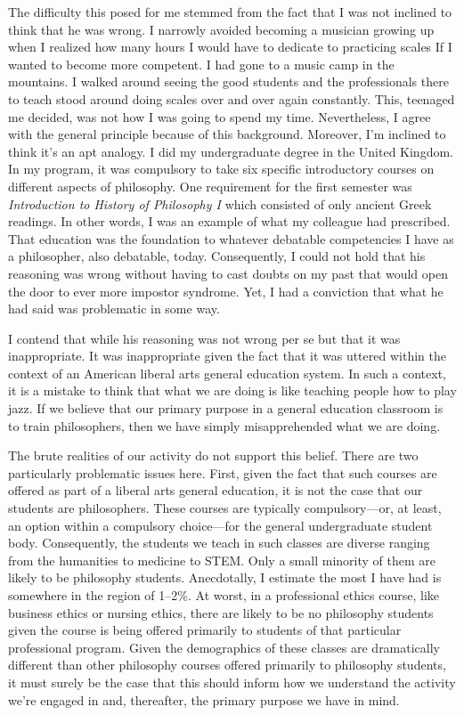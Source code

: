 \documentclass[letterpaper,notitlepage,12pt]{article}
\begin{document}
The difficulty this posed for me stemmed from the fact that I was not inclined
to think that he was wrong.
I narrowly avoided becoming a musician growing up when I realized how many hours
I would have to dedicate to practicing scales If I wanted to become more
competent.
I had gone to a music camp in the mountains.
I walked around seeing the good students and the professionals there to teach
stood around doing scales over and over again constantly.
This, teenaged me decided, was not how I was going to spend my time.
Nevertheless, I agree with the general principle because of this background.
Moreover, I'm inclined to think it's an apt analogy.
I did my undergraduate degree in the United Kingdom.
In my program, it was compulsory to take six specific introductory courses on
different aspects of philosophy.
One requirement for the first semester was \textit{Introduction to History of
Philosophy I} which consisted of only ancient Greek readings.
In other words, I was an example of what my colleague had prescribed.
That education was the foundation to whatever debatable competencies I have as a
philosopher, also debatable, today.
Consequently, I could not hold that his reasoning was wrong without having to
cast doubts on my past that would open the door to ever more impostor syndrome.
Yet, I had a conviction that what he had said was problematic in some way.

I contend that while his reasoning was not wrong per se but that it was
inappropriate.
It was inappropriate given the fact that it was uttered within the context of an
American liberal arts general education system.
In such a context, it is a mistake to think that what we are doing is like
teaching people how to play jazz.
If we believe that our primary purpose in a general education classroom is to
train philosophers, then we have simply misapprehended what we are doing.

The brute realities of our activity do not support this belief.
There are two particularly problematic issues here.
First, given the fact that such courses are offered as part of a liberal arts
general education, it is not the case that our students are philosophers.
These courses are typically compulsory---or, at least, an option within a
compulsory choice---for the general undergraduate student body.
Consequently, the students we teach in such classes are diverse ranging from the
humanities to medicine to STEM.
Only a small minority of them are likely to be philosophy students.
Anecdotally, I estimate the most I have had is somewhere in the region of
1--2\%.
At worst, in a professional ethics course, like business ethics or nursing
ethics, there are likely to be no philosophy students given the course is being
offered primarily to students of that particular professional program.
Given the demographics of these classes are dramatically different than other
philosophy courses offered primarily to philosophy students, it must surely be
the case that this should inform how we understand the activity we're engaged in
and, thereafter, the primary purpose we have in mind.
\end{document}
